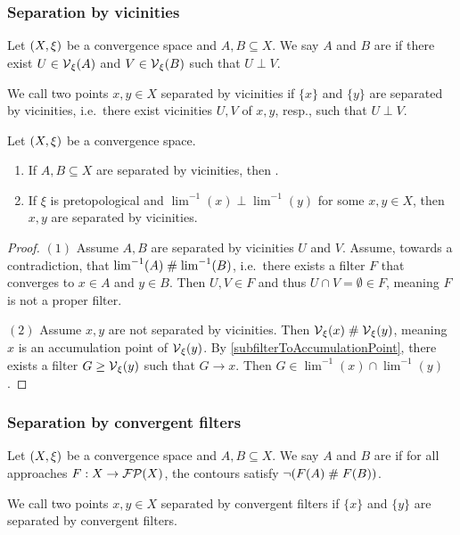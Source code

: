\subsubsection{Separation by vicinities}
\begin{definition}
Let $\left( X,\xi \right)$ be a convergence space and $A,B\subseteq X$. We say $A$ and $B$ are  if there exist $U\in \operatorname{\mathcal{V}}_\xi(A)$ and $V\in\operatorname{\mathcal{V}}_\xi(B)$ such that $U\perp V$.

We call two points $x,y\in X$ separated by vicinities if $\{x\}$ and $\{y\}$ are separated by vicinities, i.e.\ there exist vicinities $U,V$ of $x,y$, resp., such that $U\perp V$.
\end{definition}

\begin{proposition} \label{separationByVicinitiesEquivalences}
Let $\left( X,\xi \right)$ be a convergence space.
\begin{enumerate}
\item If $A,B \subseteq X$ are separated by vicinities, then .
\item If $\xi$ is pretopological and $\lim^{-1}(x)\perp \lim^{-1}(y)$ for some $x,y\in X$, then $x,y$ are separated by vicinities.
\end{enumerate}
\end{proposition}
\begin{proof}
$(1)$ Assume $A,B$ are separated by vicinities $U$ and $V$. Assume, towards a contradiction, that $\lim^{-1}(A)\mathrel{\#} \lim^{-1}(B)$, i.e.\ there exists a filter $F$ that converges to $x\in A$ and $y\in B$. Then $U,V\in F$ and thus $U\cap V = \emptyset \in F$, meaning $F$ is not a proper filter.

$(2)$ Assume $x,y$ are not separated by vicinities. Then $\operatorname{\mathcal{V}}_\xi(x)\mathrel{\#} \operatorname{\mathcal{V}}_\xi(y)$, meaning $x$ is an accumulation point of $\operatorname{\mathcal{V}}_\xi(y)$. By \ref{subfilterToAccumulationPoint}, there exists a filter $G\geq \operatorname{\mathcal{V}}_\xi(y)$ such that $G\to x$. Then $G\in \lim^{-1}(x)\cap \lim^{-1}(y)$.
\end{proof}

\subsubsection{Separation by convergent filters}
\begin{definition}
Let $\left( X,\xi \right)$ be a convergence space and $A,B\subseteq X$. We say $A$ and $B$ are  if for all approaches $F:X\to \operatorname{\mathcal{FP}}(X)$, the contours satisfy $\neg(F(A)\mathrel{\#} F(B))$.

We call two points $x,y\in X$ separated by convergent filters if $\{x\}$ and $\{y\}$ are separated by convergent filters.
\end{definition}

